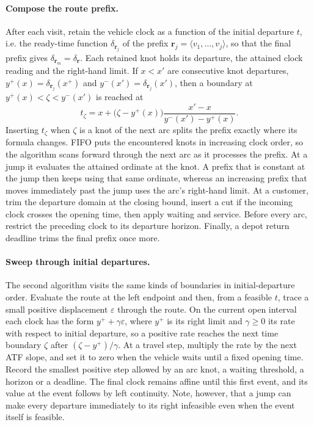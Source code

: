 \paragraph{Compose the route prefix.}
After each visit, retain the vehicle clock as a function of the initial departure $t$, i.e. the ready-time function $\delta_{\mathbf r_j}$ of the prefix $\mathbf r_j=\langle v_1,\ldots,v_j\rangle$, so that the final prefix gives $\delta_{\mathbf r_m}=\delta_{\mathbf r}$. Each retained knot holds its departure, the attained clock reading and the right-hand limit. If $x<x'$ are consecutive knot departures, $y^+(x)=\delta_{\mathbf r_j}(x^+)$ and $y^-(x')=\delta_{\mathbf r_j}(x')$, then a boundary at $y^+(x)<\zeta<y^-(x')$ is reached at
\[
 t_\zeta=x+\bigl(\zeta-y^+(x)\bigr)\frac{x'-x}{y^-(x')-y^+(x)}.
\]
Inserting $t_\zeta$ when $\zeta$ is a knot of the next arc splits the prefix exactly where its formula changes. FIFO puts the encountered knots in increasing clock order, so the algorithm scans forward through the next arc as it processes the prefix. At a jump it evaluates the attained ordinate at the knot. A prefix that is constant at the jump then keeps using that same ordinate, whereas an increasing prefix that moves immediately past the jump uses the arc's right-hand limit. At a customer, trim the departure domain at the closing bound, insert a cut if the incoming clock crosses the opening time, then apply waiting and service. Before every arc, restrict the preceding clock to its departure horizon. Finally, a depot return deadline trims the final prefix once more.

\paragraph{Sweep through initial departures.}
The second algorithm visits the same kinds of boundaries in initial-departure order. Evaluate the route at the left endpoint and then, from a feasible $t$, trace a small positive displacement $\varepsilon$ through the route. On the current open interval each clock has the form $y^++\gamma\varepsilon$, where $y^+$ is its right limit and $\gamma\geq0$ its rate with respect to initial departure, so a positive rate reaches the next time boundary $\zeta$ after $(\zeta-y^+)/\gamma$. At a travel step, multiply the rate by the next ATF slope, and set it to zero when the vehicle waits until a fixed opening time. Record the smallest positive step allowed by an arc knot, a waiting threshold, a horizon or a deadline. The final clock remains affine until this first event, and its value at the event follows by left continuity. Note, however, that a jump can make every departure immediately to its right infeasible even when the event itself is feasible.

